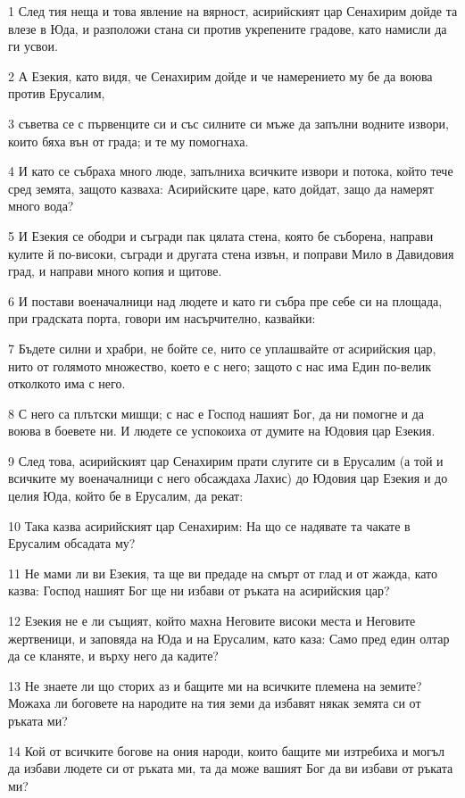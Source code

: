 \par 1 След тия неща и това явление на вярност, асирийският цар Сенахирим дойде та влезе в Юда, и разположи стана си против укрепените градове, като намисли да ги усвои.
\par 2 А Езекия, като видя, че Сенахирим дойде и че намерението му бе да воюва против Ерусалим,
\par 3 съветва се с първенците си и със силните си мъже да запълни водните извори, които бяха вън от града; и те му помогнаха.
\par 4 И като се събраха много люде, запълниха всичките извори и потока, който тече сред земята, защото казваха: Асирийските царе, като дойдат, защо да намерят много вода?
\par 5 И Езекия се ободри и съгради пак цялата стена, която бе съборена, направи кулите й по-високи, съгради и другата стена извън, и поправи Мило в Давидовия град, и направи много копия и щитове.
\par 6 И постави военачалници над людете и като ги събра пре себе си на площада, при градската порта, говори им насърчително, казвайки:
\par 7 Бъдете силни и храбри, не бойте се, нито се уплашвайте от асирийския цар, нито от голямото множество, което е с него; защото с нас има Един по-велик отколкото има с него.
\par 8 С него са плътски мишци; с нас е Господ нашият Бог, да ни помогне и да воюва в боевете ни. И людете се успокоиха от думите на Юдовия цар Езекия.
\par 9 След това, асирийският цар Сенахирим прати слугите си в Ерусалим (а той и всичките му военачалници с него обсаждаха Лахис) до Юдовия цар Езекия и до целия Юда, който бе в Ерусалим, да рекат:
\par 10 Така казва асирийският цар Сенахирим: На що се надявате та чакате в Ерусалим обсадата му?
\par 11 Не мами ли ви Езекия, та ще ви предаде на смърт от глад и от жажда, като казва: Господ нашият Бог ще ни избави от ръката на асирийския цар?
\par 12 Езекия не е ли същият, който махна Неговите високи места и Неговите жертвеници, и заповяда на Юда и на Ерусалим, като каза: Само пред един олтар да се кланяте, и върху него да кадите?
\par 13 Не знаете ли що сторих аз и бащите ми на всичките племена на земите? Можаха ли боговете на народите на тия земи да избавят някак земята си от ръката ми?
\par 14 Кой от всичките богове на ония народи, които бащите ми изтребиха и могъл да избави людете си от ръката ми, та да може вашият Бог да ви избави от ръката ми?
